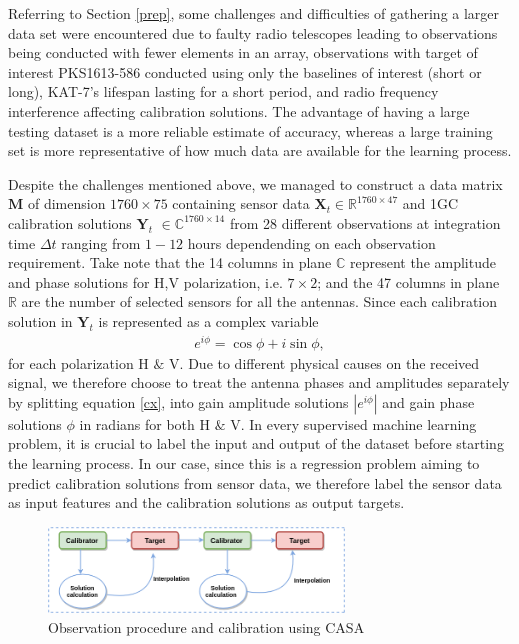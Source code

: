 Referring to Section \ref{prep}, some challenges and difficulties of gathering  a larger data set were encountered  due to faulty radio telescopes leading to observations being conducted with fewer elements in an array, observations with target of interest PKS1613-586 conducted using only the baselines of interest (short or long), KAT-7's lifespan lasting for a short period, and radio frequency interference affecting calibration solutions. The advantage of having a large testing dataset is a more reliable estimate of accuracy, whereas a large training set is more representative of how much data are available for the learning process. 

Despite the challenges mentioned above, we managed to construct a data matrix $\textbf{M}$ of dimension  $1760\times 75$ containing sensor data $\textbf{X}_t\in \mathbb{R}^{1760 \times 47}$ and 1GC calibration solutions $\textbf{Y}_t$ $\in \mathbb{C}^{1760 \times 14}$ from 28 different observations at integration time $\Delta t$ ranging from $1-12$ hours dependending on each observation requirement. Take note that the 14 columns in plane $\mathbb{C}$ represent the amplitude and phase solutions for H,V polarization, i.e. $7 \times 2$; and the 47 columns in plane $\mathbb{R}$ are the number of selected sensors for all the antennas. Since each calibration solution in $\textbf{Y}_t$ is represented as a complex variable \begin{align}
e^{i\phi}= \cos\phi + i\sin\phi, \label{cx}
\end{align} for each polarization H $\&$ V. Due to different physical causes on the received signal, we therefore choose to treat the antenna phases and amplitudes separately by splitting equation \ref{cx}, into gain amplitude solutions  $\left|e^{i\phi}\right|$ and gain phase solutions $\phi$ in radians for both H $\&$ V. In every supervised machine learning problem, it is crucial to label the input and output of the dataset before starting the learning process. In our case, since this is a regression problem aiming to predict calibration solutions from sensor data, we therefore label the sensor data as input features and the calibration solutions as output targets.
    
\begin{figure}[H]
  \centering
    \includegraphics[width=0.7\textwidth]{images/cal4.png}
    \caption{Observation procedure and calibration using CASA}
  \label{Cal2}
\end{figure}

